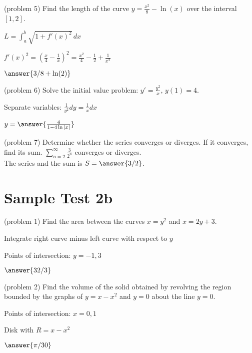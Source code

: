 \documentclass[handout]{ximera}
\begin{document}
\begin{problem}(problem 5)
Find the length of the curve $\displaystyle y = \frac{x^2}{8} - \ln(x)$ over the interval $[1, 2]$.\\
\begin{hint}
$L = \int_a^b \sqrt{1 + f'(x)^2} \, dx$
\end{hint}
\begin{hint}
$\displaystyle f'(x)^2 =\left(\frac{x}{4} - \frac{1}{x}\right)^2 
= \frac{x^2}{4} - \frac{1}{2} + \frac{1}{x^2}$
\end{hint}
$\answer{3/8 + \ln(2)}$
\end{problem}


\begin{problem}(problem 6)
Solve the initial value problem: $\displaystyle y' = \frac{y^2}{x},\, y(1) = 4$.\\
\begin{hint}
Separate variables: $\frac{1}{y^2} dy = \frac{1}{x} dx$
\end{hint}
$y = \answer{\frac{4}{1- 4\ln|x|}}$
\end{problem}


\begin{problem}(problem 7)
Determine whether the series converges or diverges.  If it converges, find its sum. $\displaystyle \sum_{n=2}^\infty \frac{3}{2^n}$
converges or diverges.\\
The series  and the sum is $S = \answer{3/2}$.
\end{problem}

\section{Sample Test 2b}

\begin{problem}(problem 1)
Find the area between the curves $x = y^2$ and $x = 2y + 3$.\\
\begin{hint}
Integrate right curve minus left curve with respect to $y$
\end{hint}
\begin{hint}
Points of intersection: $y = -1, 3$
\end{hint}
$\answer{32/3}$
\end{problem}


\begin{problem}(problem 2)
Find the volume of the solid obtained by revolving the region bounded by the 
graphs of $y = x-x^2$ and $y = 0$ about the line $ y = 0$.\\
\begin{hint}
Points of intersection: $x = 0, 1$
\end{hint}
\begin{hint}
Disk with $R = x - x^2$
\end{hint}

$\answer{\pi/30}$
\end{problem}
\end{document}
